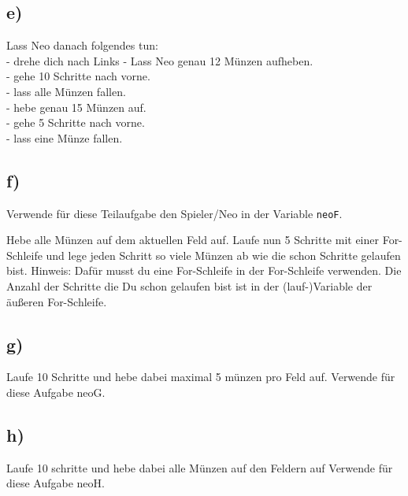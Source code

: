 \subsection*{e)}
Lass Neo danach folgendes tun:\\
- drehe dich nach Links
- Lass Neo genau 12 Münzen aufheben. \\
- gehe 10 Schritte nach vorne.\\
- lass alle Münzen fallen.\\
- hebe genau 15 Münzen auf.\\
- gehe 5 Schritte nach vorne.\\
- lass eine Münze fallen.

\subsection*{f)}
Verwende für diese Teilaufgabe den Spieler/Neo in der Variable \lstinline{neoF}.

Hebe alle Münzen auf dem aktuellen Feld auf. 
Laufe nun 5 Schritte mit einer For-Schleife und lege jeden Schritt so viele Münzen ab wie die schon Schritte gelaufen bist. 
Hinweis: Dafür musst du eine For-Schleife in der For-Schleife verwenden. Die Anzahl der Schritte die Du schon gelaufen bist ist in der (lauf-)Variable der äußeren For-Schleife.


\subsection*{g)}
 Laufe 10 Schritte und hebe dabei maximal 5 münzen pro Feld auf. Verwende für diese Aufgabe neoG.

\subsection*{h)}
Laufe 10 schritte und hebe dabei alle Münzen auf den Feldern auf Verwende für diese Aufgabe neoH.
\newpage
